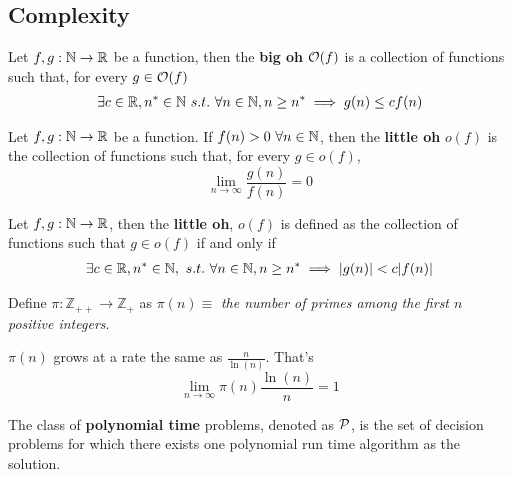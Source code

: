\documentclass{article}
\def\Z{{\mathbb Z}}
\def\R{{\mathbb R}}
\begin{document}
		\subsection{Complexity}
			\begin{definition}
				Let $f, g: \N \to \R$ be a function, then the \textbf{big oh} $\mathcal{{O}}(f)$ is a collection of functions such that, for every $g \in \mathcal{{O}}(f)$
				\begin{gather}
					\exists c \in \R, n^* \in \N\ s.t.\ \forall n \in \N, n \geq n^* \implies g(n) \leq c f(n)
				\end{gather}
			\end{definition}
			
			\begin{definition}
				Let $f, g: \N \to \R$ be a function. If $f(n) > 0\ \forall n \in \mathbb{N}$,
				then the \textbf{little oh} $o(f)$ is the collection of functions such that, for every $g \in o(f)$, 
				\begin{equation}
					\lim_{n \to \infty} \frac{g(n)}{f(n)} = 0
				\end{equation}
			\end{definition}
			
			\begin{definition}
				Let $f, g: \N \to \R$, then the \textbf{little oh}, $o(f)$ is defined as the collection of functions such that $g \in o(f)$ if and only if
				\begin{gather}
					\exists c \in \R, n^* \in \N,\ s.t.\ \forall n \in \N, n \geq n^* \implies |g(n)| < c|f(n)|
				\end{gather}
			\end{definition}
			
			\begin{definition}
				Define $\pi: \Z_{++} \to \Z_+$ as $\pi(n) \equiv$ \emph{the number of primes among the first $n$ positive integers}.
			\end{definition}
			
			\begin{theorem} $\pi(n)$ grows at a rate the same as $\frac{n}{\ln(n)}$. That's
				\begin{equation}
					\lim_{n \to \infty} \pi(n) \frac{\ln(n)}{n} = 1
				\end{equation}
			\end{theorem}
			
			\begin{definition}
				The class of \textbf{polynomial time} problems, denoted as $\mathcal{{P}}$, is the set of decision problems for which there exists one polynomial run time algorithm as the solution.
			\end{definition}
			
\end{document}
